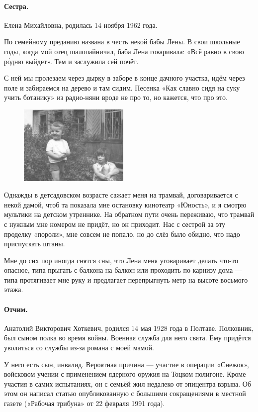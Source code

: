 \documentclass{book}
\begin{document}
\paragraph{Сестра.} Елена Михайловна, родилась 14 ноября 1962 года.

По семейному преданию названа в честь некой бабы Лены.
В свои школьные годы,
когда мой отец шалопайничал,
баба Лена говаривала: «Всё равно в свою р\'{о}дню выйдет».
Тем и заслужила сей почёт.

С ней мы пролезаем через дырку в заборе в конце дачного участка, идём через поле и забираемся на дерево и там сидим.
Песенка «Как славно сидя на суку учить ботанику» из радио-няни вроде не про то, но кажется, что про это.

\begin{figure}
\vskip-0mm
\centering
\includegraphics[width=53mm,angle=0]{pics/tosha-lena-dacha}
\vskip-4mm
\end{figure}

Однажды в детсадовском возрасте сажает меня на трамвай,
договаривается с некой дамой, чтоб та показала мне остановку кинотеатр «Юность», 
и я смотрю мультики на детском утреннике.
На обратном пути очень переживаю, что трамвай с нужным мне номером не придёт, но он приходит.
Нас с сестрой за эту проделку «пороли», мне совсем не попало, но до слёз было обидно, что надо приспускать штаны.

Мне до сих пор иногда снятся сны, что Лена меня уговаривает делать что-то опасное, типа прыгать с балкона на балкон или проходить по карнизу дома --- типа протягивает мне руку и предлагает перепрыгнуть метр на высоте восьмого этажа.

\paragraph{Отчим.}
Анатолий Викторович Хоткевич, родился 14 мая 1928 года в Полтаве.
Полковник, был сыном полка во время войны.
Военная служба для него свята.
Ему придётся уволиться со службы из-за романа с моей мамой.

У него есть сын, инвалид.
Вероятная причина --- участие в операции «Снежок», войсковом учении с применением ядерного оружия на Тоцком полигоне.
Кроме участия в самих испытаниях, он с семьёй жил недалеко от эпицентра взрыва.
Об этом он написал статью опубликованную с большими сокращениями в местной газете («Рабочая трибуна» от 22 февраля 1991 года).
\end{document}
